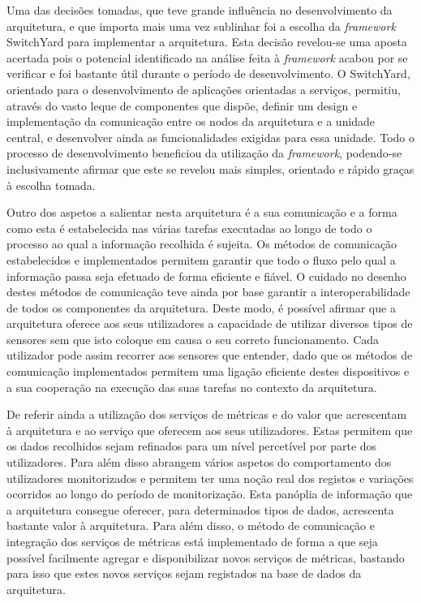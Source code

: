 Uma das decisões tomadas, que teve grande influência no desenvolvimento da arquitetura, e que importa mais uma vez sublinhar foi a escolha da \textit{framework} SwitchYard para implementar a arquitetura. Esta decisão revelou-se uma aposta acertada pois o potencial identificado na análise feita à \textit{framework} acabou por se verificar e foi bastante útil durante o período de desenvolvimento. O SwitchYard, orientado para o desenvolvimento de aplicações orientadas a serviços, permitiu, através do vasto leque de componentes que dispõe, definir um design e implementação da comunicação entre os nodos da arquitetura e a unidade central, e desenvolver ainda as funcionalidades exigidas para essa unidade. Todo o processo de desenvolvimento beneficiou da utilização da \textit{framework}, podendo-se inclusivamente afirmar que este se revelou mais simples, orientado e rápido graças à escolha tomada.

Outro dos aspetos a salientar nesta arquitetura é a sua comunicação e a forma como esta é estabelecida nas várias tarefas executadas ao longo de todo o processo ao qual a informação recolhida é sujeita. Os métodos de comunicação estabelecidos e implementados permitem garantir que todo o fluxo pelo qual a informação passa seja efetuado de forma eficiente e fiável. O cuidado no desenho destes métodos de comunicação teve ainda por base garantir a interoperabilidade de todos os componentes da arquitetura. Deste modo, é possível afirmar que a arquitetura oferece aos seus utilizadores a capacidade de utilizar diversos tipos de sensores sem que isto coloque em causa o seu correto funcionamento. Cada utilizador pode assim recorrer aos sensores que entender, dado que os métodos de comunicação implementados permitem uma ligação eficiente destes dispositivos e a sua cooperação na execução das suas tarefas no contexto da arquitetura.

De referir ainda a utilização dos serviços de métricas e do valor que acrescentam à arquitetura e ao serviço que oferecem aos seus utilizadores. Estas permitem que os dados recolhidos sejam refinados para um nível percetível por parte dos utilizadores. Para além disso abrangem vários aspetos do comportamento dos utilizadores monitorizados e permitem ter uma noção real dos registos e variações ocorridos ao longo do período de monitorização. Esta panóplia de informação que a arquitetura consegue oferecer, para determinados tipos de dados, acrescenta bastante valor à arquitetura. Para além disso, o método de comunicação e integração dos serviços de métricas está implementado de forma a que seja possível facilmente agregar e disponibilizar novos serviços de métricas, bastando para isso que estes novos serviços sejam registados na base de dados da arquitetura.

